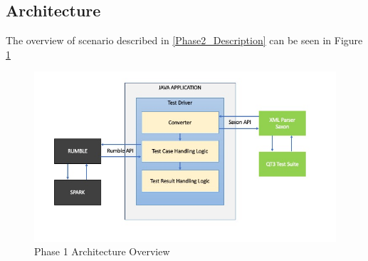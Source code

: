 \subsection{Architecture}
The overview of scenario described in \ref{Phase2_Description} can be seen in Figure \ref{fig:Phase2_Architecture}
\begin{figure}[h!]
	\vspace*{-5mm}
	\includegraphics[width=\linewidth]{architecture_diagram_phase_2.jpg}
	\vspace*{-15mm}
	\caption{Phase 1 Architecture Overview}
	\label{fig:Phase2_Architecture}
\end{figure}

